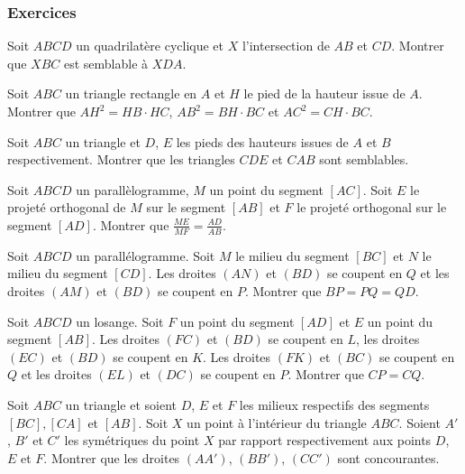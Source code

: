 
\subsubsection{Exercices}


\begin{exo}
Soit $ABCD$ un quadrilatère cyclique et $X$ l’intersection de $AB$ et $CD$. Montrer que $XBC$ est semblable à $XDA$.
\end{exo}


\begin{exo}
Soit $ABC$ un triangle rectangle en $A$ et $H$ le pied de la hauteur issue de $A$. Montrer que $AH^2 = HB \cdot HC$, $AB^2 = BH \cdot BC$ et $AC^2 = CH \cdot BC$.
\end{exo}


\begin{exo}
Soit $ABC$ un triangle et $D$, $E$ les pieds des hauteurs issues de $A$ et $B$ respectivement. Montrer que les triangles $CDE$ et $CAB$ sont semblables.
\end{exo}


\begin{exo}
Soit $ABCD$ un parallèlogramme, $M$ un point du segment $[AC]$. Soit $E$ le projeté orthogonal de $M$ sur le segment $[AB]$ et $F$ le projeté orthogonal sur le segment $[AD]$. Montrer que $\frac{ME}{MF} = \frac{AD}{AB}$.
\end{exo}


\begin{exo}
Soit $ABCD$ un parallélogramme. Soit $M$ le milieu du segment $[BC]$ et $N$ le milieu du segment $[CD]$. Les droites $(AN)$ et $(BD)$ se coupent en $Q$ et les droites $(AM)$ et $(BD)$ se coupent en $P$. Montrer que $BP = PQ = QD$.
\end{exo}


\begin{exo}
Soit $ABCD$ un losange. Soit $F$ un point du segment $[AD]$ et $E$ un point du segment $[AB]$. Les droites $(FC)$ et $(BD)$ se coupent en $L$, les droites $(EC)$ et $(BD)$ se coupent en $K$. Les droites $(FK)$ et $(BC)$ se coupent en $Q$ et les droites $(EL)$ et $(DC)$ se coupent en $P$. Montrer que $CP = CQ$.
\end{exo}


\begin{exo}%
Soit $ABC$ un triangle et soient $D$, $E$ et $F$ les milieux respectifs des segments $[BC], [CA]$ et $[AB]$. Soit $X$ un point à l'intérieur du triangle $ABC$. Soient $A'$, $B'$ et $C'$ les symétriques du point $X$ par rapport respectivement aux points $D$, $E$ et $F$. Montrer que les droites $(AA')$, $(BB')$, $(CC')$ sont concourantes.
\end{exo}



